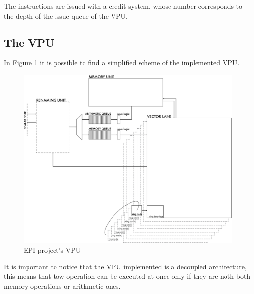 The instructions are issued with a credit system, whose number corresponds to the  depth of the issue queue of the VPU.\\



\subsection{The VPU}
In Figure \ref{VPU} it is possible to find a simplified scheme of the implemented VPU.\\

\begin{figure}[H]
    \centering
    \includegraphics[scale = 0.5]{Chapter_1/img/VPU.png}
    \caption{EPI project's VPU}
    \label{VPU}
\end{figure}
It is important to notice that the VPU implemented is a decoupled architecture, this means that tow operation can be executed at once only if they are noth both memory operations or arithmetic ones.\\


